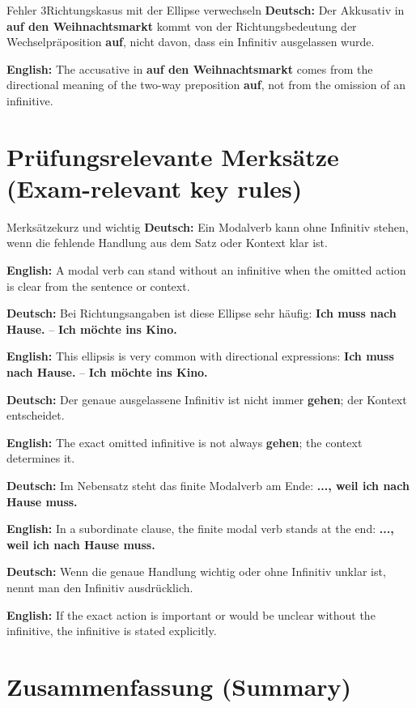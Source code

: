 \documentclass[a4paper,11pt]{article}
\newcommand{\GermanText}[1]{\textbf{Deutsch: }#1\par}
\newcommand{\EnglishText}[1]{{\small\color{SoftGray}\textbf{English: }#1\par}}
\begin{document}
        \begin{grammarentry}{Fehler 3}{Richtungskasus mit der Ellipse verwechseln}
            \GermanText{Der Akkusativ in \textbf{auf den Weihnachtsmarkt} kommt von der Richtungsbedeutung der Wechselpräposition \textbf{auf}, nicht davon, dass ein Infinitiv ausgelassen wurde.}
            \EnglishText{The accusative in \textbf{auf den Weihnachtsmarkt} comes from the directional meaning of the two-way preposition \textbf{auf}, not from the omission of an infinitive.}
        \end{grammarentry}

    \section{Prüfungsrelevante Merksätze \textnormal{(Exam-relevant key rules)}}

        \begin{grammarentry}{Merksätze}{kurz und wichtig}
            \GermanText{Ein Modalverb kann ohne Infinitiv stehen, wenn die fehlende Handlung aus dem Satz oder Kontext klar ist.}
            \EnglishText{A modal verb can stand without an infinitive when the omitted action is clear from the sentence or context.}

            \GermanText{Bei Richtungsangaben ist diese Ellipse sehr häufig: \textbf{Ich muss nach Hause.} -- \textbf{Ich möchte ins Kino.}}
            \EnglishText{This ellipsis is very common with directional expressions: \textbf{Ich muss nach Hause.} -- \textbf{Ich möchte ins Kino.}}

            \GermanText{Der genaue ausgelassene Infinitiv ist nicht immer \textbf{gehen}; der Kontext entscheidet.}
            \EnglishText{The exact omitted infinitive is not always \textbf{gehen}; the context determines it.}

            \GermanText{Im Nebensatz steht das finite Modalverb am Ende: \textbf{..., weil ich nach Hause muss.}}
            \EnglishText{In a subordinate clause, the finite modal verb stands at the end: \textbf{..., weil ich nach Hause muss.}}

            \GermanText{Wenn die genaue Handlung wichtig oder ohne Infinitiv unklar ist, nennt man den Infinitiv ausdrücklich.}
            \EnglishText{If the exact action is important or would be unclear without the infinitive, the infinitive is stated explicitly.}
        \end{grammarentry}

    \section{Zusammenfassung \textnormal{(Summary)}}
\end{document}
